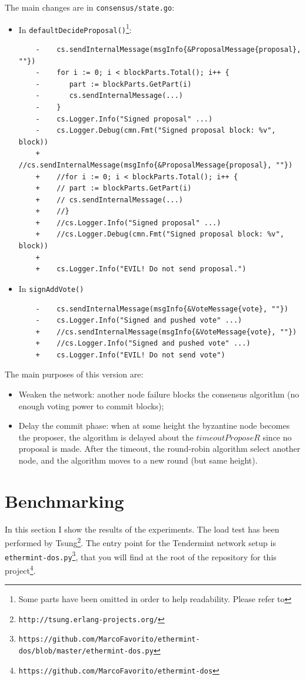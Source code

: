 \documentclass[]{article}
\begin{document}
The main changes are in \texttt{consensus/state.go}:
\begin{itemize}
	\item In \texttt{defaultDecideProposal()}\footnote{Some parts have been omitted in order to help readability. Please refer to }:
	\begin{verbatim}
	-    cs.sendInternalMessage(msgInfo{&ProposalMessage{proposal}, ""})
	-    for i := 0; i < blockParts.Total(); i++ {
	-    	part := blockParts.GetPart(i)
	-    	cs.sendInternalMessage(...)
	-    }
	-    cs.Logger.Info("Signed proposal" ...)
	-    cs.Logger.Debug(cmn.Fmt("Signed proposal block: %v", block))
	+    //cs.sendInternalMessage(msgInfo{&ProposalMessage{proposal}, ""})
	+    //for i := 0; i < blockParts.Total(); i++ {
	+    //	part := blockParts.GetPart(i)
	+    //	cs.sendInternalMessage(...)
	+    //}
	+    //cs.Logger.Info("Signed proposal" ...)
	+    //cs.Logger.Debug(cmn.Fmt("Signed proposal block: %v", block))
	+
	+    cs.Logger.Info("EVIL! Do not send proposal.")
	\end{verbatim}
	\item In \texttt{signAddVote()}
	\begin{verbatim}
	-    cs.sendInternalMessage(msgInfo{&VoteMessage{vote}, ""})
	-    cs.Logger.Info("Signed and pushed vote" ...)
	+    //cs.sendInternalMessage(msgInfo{&VoteMessage{vote}, ""})
	+    //cs.Logger.Info("Signed and pushed vote" ...)
	+    cs.Logger.Info("EVIL! Do not send vote")	
	\end{verbatim}
\end{itemize}
The main purposes of this version are:
\begin{itemize}
\item Weaken the network: another node failure blocks the consensus algorithm (no enough voting power to commit blocks);
\item Delay the commit phase: when at some height the byzantine node becomes the proposer, the algorithm is delayed about the $timeoutProposeR$ since no proposal is made. After the timeout, the round-robin algorithm select another node, and the algorithm moves to a new round (but same height).
\end{itemize}


\section{Benchmarking}
\label{bench}
In this section I show the results of the experiments. The load test has been performed by Tsung\footnote{\texttt{http://tsung.erlang-projects.org/}}. The entry point for the Tendermint network setup is \texttt{ethermint-dos.py}\footnote{\texttt{https://github.com/MarcoFavorito/ethermint-dos/blob/master/ethermint-dos.py}}, that you will find at the root of the repository for this project\footnote{\texttt{https://github.com/MarcoFavorito/ethermint-dos}}. \\
\end{document}
